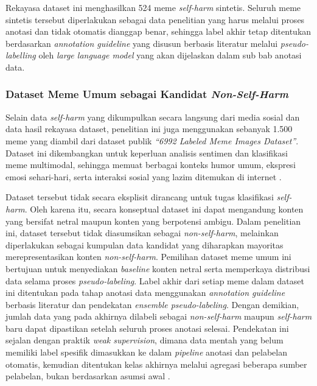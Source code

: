 Rekayasa dataset ini menghasilkan 524 meme \textit{self-harm} sintetis. Seluruh meme sintetis tersebut diperlakukan sebagai data penelitian yang harus melalui proses anotasi dan tidak otomatis dianggap benar, sehingga label akhir tetap ditentukan berdasarkan \textit{annotation guideline} yang disusun berbasis literatur melalui \textit{pseudo-labelling} oleh \textit{large language model} yang akan dijelaskan dalam sub bab anotasi data.

\subsubsection{Dataset Meme Umum sebagai Kandidat \textit{Non-Self-Harm}} \label{subsubsec:dataset_meme_umum_non_self_harm}
Selain data \textit{self-harm} yang dikumpulkan secara langsung dari media sosial dan data hasil rekayasa dataset, penelitian ini juga menggunakan sebanyak 1.500 meme yang diambil dari dataset publik \textit{``6992 Labeled Meme Images Dataset''}. Dataset ini dikembangkan untuk keperluan analisis sentimen dan klasifikasi meme multimodal, sehingga memuat berbagai konteks humor umum, ekspresi emosi sehari-hari, serta interaksi sosial yang lazim ditemukan di internet \cite{javaid_6992_meme_images_2023}.

Dataset tersebut tidak secara eksplisit dirancang untuk tugas klasifikasi \textit{self-harm}. Oleh karena itu, secara konseptual dataset ini dapat mengandung konten yang bersifat netral maupun konten yang berpotensi ambigu. Dalam penelitian ini, dataset tersebut tidak diasumsikan sebagai \textit{non-self-harm}, melainkan diperlakukan sebagai kumpulan data kandidat yang diharapkan mayoritas merepresentasikan konten \textit{non-self-harm}. Pemilihan dataset meme umum ini bertujuan untuk menyediakan \textit{baseline} konten netral serta memperkaya distribusi data selama proses \textit{pseudo-labeling}. Label akhir dari setiap meme dalam dataset ini ditentukan pada tahap anotasi data menggunakan \textit{annotation guideline} berbasis literatur dan pendekatan \textit{ensemble pseudo-labeling}. Dengan demikian, jumlah data yang pada akhirnya dilabeli sebagai \textit{non-self-harm} maupun \textit{self-harm} baru dapat dipastikan setelah seluruh proses anotasi selesai. Pendekatan ini sejalan dengan praktik \textit{weak supervision}, dimana data mentah yang belum memiliki label spesifik dimasukkan ke dalam \textit{pipeline} anotasi dan pelabelan otomatis, kemudian ditentukan kelas akhirnya melalui agregasi beberapa sumber pelabelan, bukan berdasarkan asumsi awal \cite{ratner2019}.


